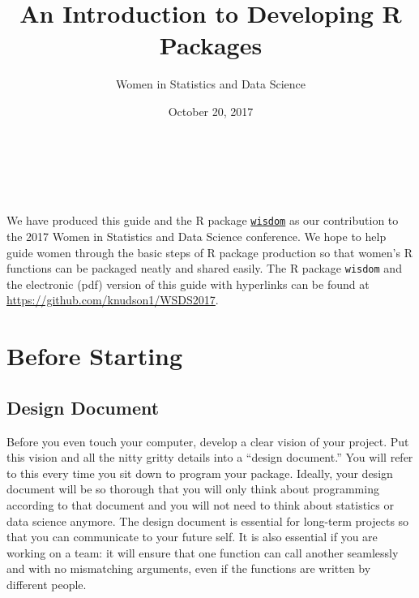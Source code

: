 \documentclass{article}
\title{An Introduction to Developing R Packages}
\author{Women in Statistics and Data Science}
\date{October 20, 2017}
\begin{document}
\maketitle{}

\\
 \\ \\ 



We have  produced this guide and the R package \href{https://github.com/knudson1/WSDS2017}{\texttt{wisdom}} as our contribution to the 2017 Women in Statistics and Data Science conference. We hope to help guide women through the basic steps of R package production so that  women's R functions can be packaged neatly and shared easily. The R package \texttt{wisdom} and the electronic (pdf) version of this guide with  hyperlinks can be found at \href{https://github.com/knudson1/WSDS2017}{\url{https://github.com/knudson1/WSDS2017}}. 


\section{Before Starting}




\subsection{Design Document}
Before you even touch your computer, develop a clear vision of your project. Put this vision and all the nitty gritty details  into a ``design document.'' You will refer to this every time you sit down to program your package. Ideally,  your design document  will be so thorough that you will only think about programming according to that document and you will not need to think about statistics or data science anymore. The design document is essential for long-term projects so that you can communicate to your future self. It is also essential if you are working on a team: it will ensure that one function can call another seamlessly and with no mismatching arguments, even if the functions are written by different people.
\end{document}
